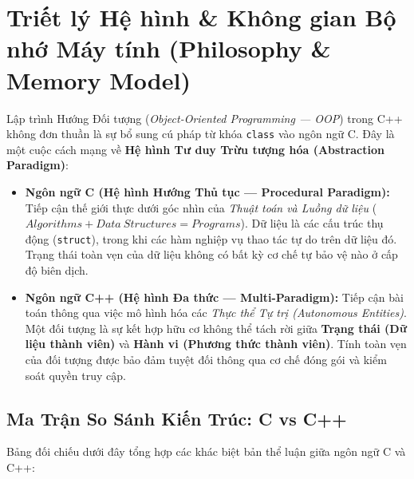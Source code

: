 \documentclass[12pt,a4paper,oneside]{book}
\begin{document}
\frontmatter
\tableofcontents
\mainmatter

\chapter{Triết lý Hệ hình \& Không gian Bộ nhớ Máy tính (Philosophy \& Memory Model)}

\begin{theorybox}
Lập trình Hướng Đối tượng (\textit{Object-Oriented Programming --- OOP}) trong C++ không đơn thuần là sự bổ sung cú pháp từ khóa \texttt{class} vào ngôn ngữ C. Đây là một cuộc cách mạng về \textbf{Hệ hình Tư duy Trừu tượng hóa (Abstraction Paradigm)}:
\begin{itemize}
    \item \textbf{Ngôn ngữ C (Hệ hình Hướng Thủ tục --- Procedural Paradigm):} Tiếp cận thế giới thực dưới góc nhìn của \textit{Thuật toán và Luồng dữ liệu} ($Algorithms + Data\ Structures = Programs$). Dữ liệu là các cấu trúc thụ động (\texttt{struct}), trong khi các hàm nghiệp vụ thao tác tự do trên dữ liệu đó. Trạng thái toàn vẹn của dữ liệu không có bất kỳ cơ chế tự bảo vệ nào ở cấp độ biên dịch.
    \item \textbf{Ngôn ngữ C++ (Hệ hình Đa thức --- Multi-Paradigm):} Tiếp cận bài toán thông qua việc mô hình hóa các \textit{Thực thể Tự trị (Autonomous Entities)}. Một đối tượng là sự kết hợp hữu cơ không thể tách rời giữa \textbf{Trạng thái (Dữ liệu thành viên)} và \textbf{Hành vi (Phương thức thành viên)}. Tính toàn vẹn của đối tượng được bảo đảm tuyệt đối thông qua cơ chế đóng gói và kiểm soát quyền truy cập.
\end{itemize}
\end{theorybox}

\section{Ma Trận So Sánh Kiến Trúc: C vs C++}

Bảng đối chiếu dưới đây tổng hợp các khác biệt bản thể luận giữa ngôn ngữ C và C++:
\end{document}
